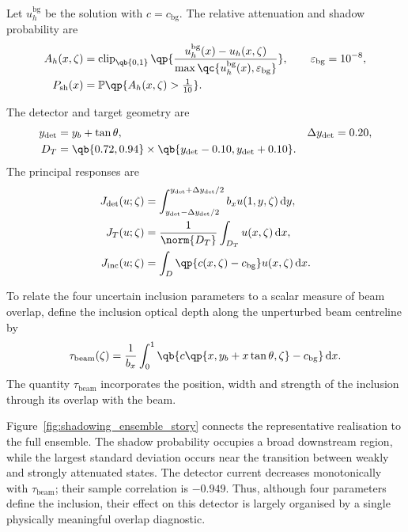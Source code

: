 \documentclass[final]{amsart}
\begin{document}
Let $u_h^{\mathrm{bg}}$ be the solution with
$c=c_{\mathrm{bg}}$. The relative attenuation and shadow probability
are
\begin{align}
A_h(x,\zeta)
&=
\operatorname{clip}_{\qb{0,1}}
\qp{
\frac{u_h^{\mathrm{bg}}(x)-u_h(x,\zeta)}
{\max\qc{u_h^{\mathrm{bg}}(x),\varepsilon_{\mathrm{bg}}}}
},
\qquad
\varepsilon_{\mathrm{bg}}=10^{-8},
\label{eq:shadow_relative_attenuation}
\\
P_{\mathrm{sh}}(x)
&=
\mathbb P\qp{A_h(x,\zeta)>\tfrac{1}{10}}.
\label{eq:shadow_probability}
\end{align}

The detector and target geometry are
\begin{align}
y_{\mathrm{det}}
&=y_b+\tan\theta,
&
\Delta y_{\mathrm{det}}
&=0.20,
\label{eq:shadow_detector_geometry}
\\
D_T
&=
\qb{0.72,0.94}
\times
\qb{y_{\mathrm{det}}-0.10,y_{\mathrm{det}}+0.10}.
\label{eq:shadow_target_region}
\end{align}
The principal responses are
\begin{align}
J_{\mathrm{det}}(u;\zeta)
&=
\int_{y_{\mathrm{det}}-\Delta y_{\mathrm{det}}/2}
     ^{y_{\mathrm{det}}+\Delta y_{\mathrm{det}}/2}
b_xu(1,y,\zeta)\,\mathrm dy,
\label{eq:shadow_detector}
\\
J_T(u;\zeta)
&=
\frac{1}{\norm{D_T}}
\int_{D_T}u(x,\zeta)\,\mathrm dx,
\label{eq:shadow_target_mean}
\\
J_{\mathrm{inc}}(u;\zeta)
&=
\int_D
\qp{c(x,\zeta)-c_{\mathrm{bg}}}
u(x,\zeta)\,\mathrm dx.
\label{eq:shadow_inclusion_absorption}
\end{align}

To relate the four uncertain inclusion parameters to a scalar measure
of beam overlap, define the inclusion optical depth along the
unperturbed beam centreline by
\begin{equation}
\tau_{\mathrm{beam}}(\zeta)
=
\frac{1}{b_x}
\int_0^1
\qb{
c\qp{x,y_b+x\tan\theta,\zeta}-c_{\mathrm{bg}}
}
\,\mathrm dx.
\label{eq:shadow_beamline_optical_depth}
\end{equation}
The quantity $\tau_{\mathrm{beam}}$ incorporates the position, width
and strength of the inclusion through its overlap with the beam.

Figure~\ref{fig:shadowing_ensemble_story} connects the representative
realisation to the full ensemble. The shadow probability occupies a
broad downstream region, while the largest standard deviation occurs
near the transition between weakly and strongly attenuated states.
The detector current decreases monotonically with
$\tau_{\mathrm{beam}}$; their sample correlation is $-0.949$. Thus,
although four parameters define the inclusion, their effect on this
detector is largely organised by a single physically meaningful
overlap diagnostic.
\end{document}
